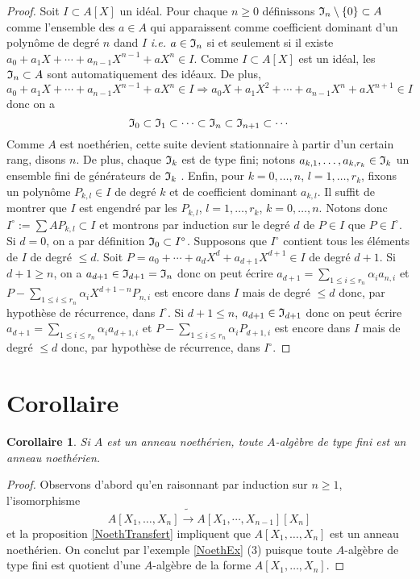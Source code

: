 \documentclass[a4paper, oneside, 12pt]{book}
\theoremstyle{theoremeStyle} %
\newtheorem{corollaire}[theoreme]{Corollaire}
\theoremstyle{definition} %
\newcommand{\ie}{\textit{i.e.}} %
\begin{document}
\begin{proof}Soit $I\subset A[X]$ un idéal. Pour chaque $n\geq 0$ définissons $\frak{I}_n\setminus \lbrace 0\rbrace\subset A$ comme l'ensemble des $a\in A$ qui apparaissent comme coefficient dominant  d'un polynôme de degré $n$ dand $I$ \ie{} $a\in \frak{I}_n$ si et seulement si il existe $a_0+a_1X+\cdots+a_{n-1}X^{n-1}+aX^n\in I$. Comme $I\subset A[X]$ est un idéal, les $\frak{I}_n\subset A$ sont automatiquement des idéaux. De plus,  $$a_0+a_1X+\cdots+a_{n-1}X^{n-1}+aX^n\in I\Rightarrow a_0X+a_1X^2+\cdots+a_{n-1}X^{n}+aX^{n+1}\in I$$ donc on a
$$\frak{I}_0\subset \frak{I}_1\subset \cdots\subset \frak{I}_n\subset \frak{I}_{n+1}\subset \cdots$$
Comme $A$ est noethérien, cette suite devient stationnaire à partir d'un certain rang, disons $n$. De plus,  chaque $\frak{I}_k$ est de type fini; notons $a_{k,1},\dots, a_{k,r_k}\in \frak{I}_k$ un ensemble fini de générateurs de $\frak{I}_k$ . Enfin,  pour  $k=0,\dots, n$, $l=1,\dots, r_k$, fixons un polynôme $P_{k,l}\in I$ de degré $k$ et de coefficient dominant $a_{k,l}$. Il suffit de montrer que $I$ est engendré par les $P_{k,l}$,  $l=1,\dots, r_k$, $k=0,\dots, n$. Notons donc $I^\circ:=\sum AP_{k,l}\subset I$ et montrons par induction sur le degré $d$ de $P\in I$ que $P\in I^\circ$. Si $d=0$, on a par définition $  \frak{I}_0\subset I^\circ$. Supposons que $I^\circ$ contient tous les   éléments de $I$ de degré $\leq d$. Soit $P=a_0+\cdots+a_dX^d+a_{d+1}X^{d+1}\in I$ de degré $d+1$. Si $d+1\geq n$, on a $a_{d+1}\in \frak{I}_{d+1}=\frak{I}_n$ donc on peut écrire $a_{d+1}=\sum_{1\leq i\leq r_n}\alpha_ia_{n,i}$ et $P-\sum_{1\leq i\leq r_n}\alpha_iX^{d+1-n}P_{n,i}$ est encore dans $I$ mais de degré $\leq d$ donc, par hypothèse de récurrence, dans $I^\circ$. Si $d+1\leq n$, $a_{d+1}\in \frak{I}_{d+1}$ donc on peut écrire $a_{d+1}=\sum_{1\leq i\leq r_n}\alpha_ia_{d+1,i}$ et $P-\sum_{1\leq i\leq r_n}\alpha_i P_{d+1,i}$ est encore dans $I$ mais de degré $\leq d$ donc, par hypothèse de récurrence, dans $I^\circ$.
\end{proof}

\section{Corollaire}
\begin{corollaire}\label{NoethTransfertCor}
  Si $A$ est un anneau noethérien, toute $A$-algèbre de type fini est un anneau noethérien.
\end{corollaire}

\begin{proof}
  Observons d'abord qu'en raisonnant par induction sur $n\geq 1$, l'isomorphisme $$A[X_1,\dots, X_n]\tilde{\rightarrow} A[X_1,\cdots,X_{n-1}] [X_n]$$ et la proposition \ref{NoethTransfert} impliquent que $A[X_1,\dots, X_n]$ est un anneau noethérien. On conclut par l'exemple \ref{NoethEx} (3) puisque toute $A$-algèbre de type fini  est quotient d'une $A$-algèbre de la forme $A[X_1,\dots, X_n]$.
\end{proof}
\end{document}
